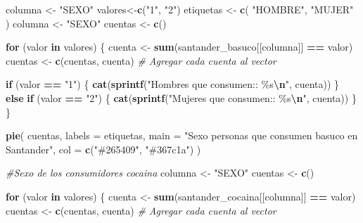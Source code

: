 \documentclass[
]{article}
\newenvironment{Shaded}{\begin{snugshade}}{\end{snugshade}}
\newcommand{\AttributeTok}[1]{\textcolor[rgb]{0.13,0.29,0.53}{#1}}
\newcommand{\CommentTok}[1]{\textcolor[rgb]{0.56,0.35,0.01}{\textit{#1}}}
\newcommand{\ControlFlowTok}[1]{\textcolor[rgb]{0.13,0.29,0.53}{\textbf{#1}}}
\newcommand{\FunctionTok}[1]{\textcolor[rgb]{0.13,0.29,0.53}{\textbf{#1}}}
\newcommand{\NormalTok}[1]{#1}
\newcommand{\OtherTok}[1]{\textcolor[rgb]{0.56,0.35,0.01}{#1}}
\newcommand{\SpecialCharTok}[1]{\textcolor[rgb]{0.81,0.36,0.00}{\textbf{#1}}}
\newcommand{\StringTok}[1]{\textcolor[rgb]{0.31,0.60,0.02}{#1}}
\begin{document}
\label{section7}
\begin{Shaded}
\begin{Highlighting}[]

\NormalTok{columna }\OtherTok{\textless{}{-}} \StringTok{"SEXO"}
\NormalTok{valores}\OtherTok{\textless{}{-}}\FunctionTok{c}\NormalTok{(}\StringTok{"1"}\NormalTok{, }\StringTok{"2"}\NormalTok{)}
\NormalTok{etiquetas }\OtherTok{\textless{}{-}} \FunctionTok{c}\NormalTok{(}
  \StringTok{"HOMBRE"}\NormalTok{,}
  \StringTok{"MUJER"}
\NormalTok{)}
\NormalTok{columna }\OtherTok{\textless{}{-}} \StringTok{"SEXO"}
\NormalTok{cuentas }\OtherTok{\textless{}{-}} \FunctionTok{c}\NormalTok{()}

\ControlFlowTok{for}\NormalTok{ (valor }\ControlFlowTok{in}\NormalTok{ valores) \{}
\NormalTok{  cuenta }\OtherTok{\textless{}{-}} \FunctionTok{sum}\NormalTok{(santander\_basuco[[columna]] }\SpecialCharTok{==}\NormalTok{ valor)}
\NormalTok{  cuentas }\OtherTok{\textless{}{-}} \FunctionTok{c}\NormalTok{(cuentas, cuenta)  }\CommentTok{\# Agregar cada cuenta al vector}
  
  \ControlFlowTok{if}\NormalTok{ (valor }\SpecialCharTok{==} \StringTok{"1"}\NormalTok{) \{}
    \FunctionTok{cat}\NormalTok{(}\FunctionTok{sprintf}\NormalTok{(}\StringTok{"Hombres que consumen:: \%s}\SpecialCharTok{\textbackslash{}n}\StringTok{"}\NormalTok{, cuenta))}
\NormalTok{  \} }\ControlFlowTok{else} \ControlFlowTok{if}\NormalTok{ (valor }\SpecialCharTok{==} \StringTok{"2"}\NormalTok{) \{}
    \FunctionTok{cat}\NormalTok{(}\FunctionTok{sprintf}\NormalTok{(}\StringTok{"Mujeres que consumen:: \%s}\SpecialCharTok{\textbackslash{}n}\StringTok{"}\NormalTok{, cuenta))}
\NormalTok{  \}}
\NormalTok{\}}

\FunctionTok{pie}\NormalTok{(}
\NormalTok{  cuentas,}
  \AttributeTok{labels =}\NormalTok{ etiquetas,}
  \AttributeTok{main =} \StringTok{"Sexo personas que consumen basuco  en Santander"}\NormalTok{,}
  \AttributeTok{col =} \FunctionTok{c}\NormalTok{(}\StringTok{"\#265409"}\NormalTok{, }\StringTok{"\#367c1a"}\NormalTok{)}
\NormalTok{)}

\CommentTok{\#Sexo de los consumidores cocaina }
\NormalTok{columna }\OtherTok{\textless{}{-}} \StringTok{"SEXO"}
\NormalTok{cuentas }\OtherTok{\textless{}{-}} \FunctionTok{c}\NormalTok{()}

\ControlFlowTok{for}\NormalTok{ (valor }\ControlFlowTok{in}\NormalTok{ valores) \{}
\NormalTok{  cuenta }\OtherTok{\textless{}{-}} \FunctionTok{sum}\NormalTok{(santander\_cocaina[[columna]] }\SpecialCharTok{==}\NormalTok{ valor)}
\NormalTok{  cuentas }\OtherTok{\textless{}{-}} \FunctionTok{c}\NormalTok{(cuentas, cuenta)  }\CommentTok{\# Agregar cada cuenta al vector}
  

\end{Highlighting}
\end{Shaded}
\end{document}
